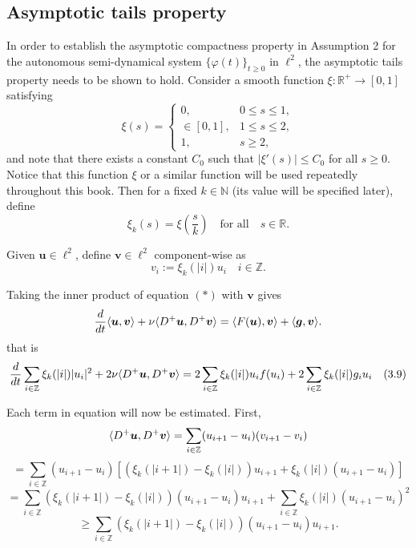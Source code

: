 \documentclass[11pt]{beamer}
\begin{document}
\subsection{Asymptotic tails property}
\begin{frame}
    In order to establish the asymptotic compactness property in Assumption 2 for the autonomous semi-dynamical system $\{\varphi(t)\}_{t \geq 0}$ in $\ell^2$, the asymptotic tails property needs to be shown to hold.
    Consider a smooth function $\xi : \mathbb{R}^+ \to [0, 1]$ satisfying
    \[
    \xi(s) =
    \begin{cases}
    0, & 0 \leq s \leq 1, \\
    \in [0, 1], & 1 \leq s \leq 2, \\
    1, & s \geq 2,
    \end{cases}
    \]
    and note that there exists a constant $C_0$ such that $|\xi'(s)| \leq C_0$ for all $s \geq 0$. Notice that this function $\xi$ or a similar function will be used repeatedly throughout this book. Then for a fixed $k \in \mathbb{N}$ (its value will be specified later), define
    \[
    \xi_k(s) = \xi\left(\frac{s}{k}\right) \quad \text{for all} \quad s \in \mathbb{R}.
    \]
  
\end{frame}

\begin{frame}
        
    Given $\boldsymbol{u} \in \ell^2$, define $\boldsymbol{v} \in \ell^2$ component-wise as
    \[
    v_i := \xi_k(|i|) u_i \quad i \in \mathbb{Z}.
    \]
    
    Taking the inner product of equation \((*)\) with $\boldsymbol{v}$ gives
    \[
    \frac{d}{dt} \langle \boldsymbol{u}, \boldsymbol{v} \rangle + \nu \langle \mathnormal{D}^+ \boldsymbol{u}, \mathnormal{D}^+ \boldsymbol{v} \rangle = \langle \mathnormal{F}(\boldsymbol{u}), \boldsymbol{v} \rangle + \langle \boldsymbol{g}, \boldsymbol{v} \rangle.
    \]
    that is
    \[
    \frac{d}{dt} \sum_{i \in \mathbb{Z}} \xi_k(|i|) |u_i|^2 + 2\mathnormal{\nu} \langle \mathnormal{D}^+ \boldsymbol{u}, \mathnormal{D}^+ \boldsymbol{v} \rangle 
    = 2 \sum_{i \in \mathbb{Z}} \xi_k(|i|) u_i \mathnormal{f}(u_i) + 2 \sum_{i \in \mathbb{Z}} \xi_k(|i|) g_i u_i

    \quad (3.9)
    \]

\end{frame}

\begin{frame}
        
    Each term in equation will now be estimated. First,
    \[
    \langle \mathnormal{D}^+ \boldsymbol{u}, \mathnormal{D}^+ \boldsymbol{v} \rangle = \sum_{i \in \mathbb{Z}} (u_{i+1} - u_i)(v_{i+1} - v_i)
    \]
    \[
    = \sum_{i \in \mathbb{Z}} (u_{i+1} - u_i) \left[ (\xi_k(|i+1|) - \xi_k(|i|)) u_{i+1} + \xi_k(|i|)(u_{i+1} - u_i) \right]
    \]
    \[
    = \sum_{i \in \mathbb{Z}} (\xi_k(|i+1|) - \xi_k(|i|)) (u_{i+1} - u_i) u_{i+1} + \sum_{i \in \mathbb{Z}} \xi_k(|i|)(u_{i+1} - u_i)^2
    \]
    \[
    \geq \sum_{i \in \mathbb{Z}} (\xi_k(|i+1|) - \xi_k(|i|)) (u_{i+1} - u_i) u_{i+1}.
    \]
    
\end{frame}
\end{document}
